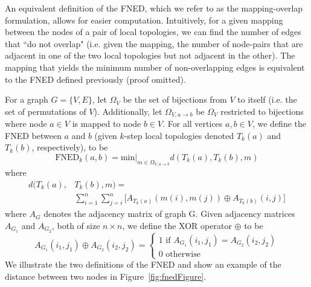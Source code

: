 \documentclass[10pt,twocolumn,fleqn]{article}
\begin{document}
An equivalent definition of the FNED, which we refer to as the mapping-overlap formulation, allows for easier computation. Intuitively, for a given mapping between the nodes of a pair of local topologies, we can find the number of edges that ``do not overlap" (i.e. given the mapping, the number of node-pairs that are adjacent in one of the two local topologies but not adjacent in the other). The mapping that yields the minimum number of non-overlapping edges is equivalent to the FNED defined previously (proof omitted).

For a graph $G = \{V,E\}$, let $\Omega_{V}$ be the set of bijections from $V$ to itself (i.e. the set of permutations of $V$). Additionally, let $\Omega_{V, a\rightarrow b}$ be $\Omega_{V}$ restricted to bijections where node $a\in V$ is mapped to node $b\in V$. For all vertices $a,b \in V$, we define the FNED between $a$ and $b$ (given $k$-step local topologies denoted $T_{k}(a)$ and $T_{k}(b)$, respectively), to be
\begin{equation}
\text{FNED}_{k}(a,b) = \text{min} \big|_{m \in \Omega_{V, a\rightarrow b}} d(T_{k}(a), T_{k}(b), m)
\end{equation}
where
\begin{equation}
\begin{split}
d(T_{k}(a), & T_{k}(b), m) = \\ 
& \sum_{i=1}^{n} \sum_{j=i}^{n} \Big[ A_{T_{k}(a)}(m(i),m(j)) \oplus A_{T_{k}(b)}(i,j)  \Big]
\end{split}
\end{equation}
where $A_{G}$ denotes the adjacency matrix of graph G. Given adjacency matrices $A_{G_{1}}$ and $A_{G_{2}}$, both of size $n \times n$, we define the XOR operator $\oplus$ to be
\begin{equation}
A_{G_{1}}(i_{1},j_{1}) \oplus A_{G_{2}}(i_{2},j_{2}) = 
\begin{cases}
1 \text{ if } A_{G_{1}}(i_{1},j_{1}) = A_{G_{2}}(i_{2},j_{2}) \\ 
0 \text{ otherwise}
\end{cases}
\end{equation}
We illustrate the two definitions of the FNED and show an example of the distance between two nodes in Figure~\ref{fig:fnedFigure}.
\end{document}

